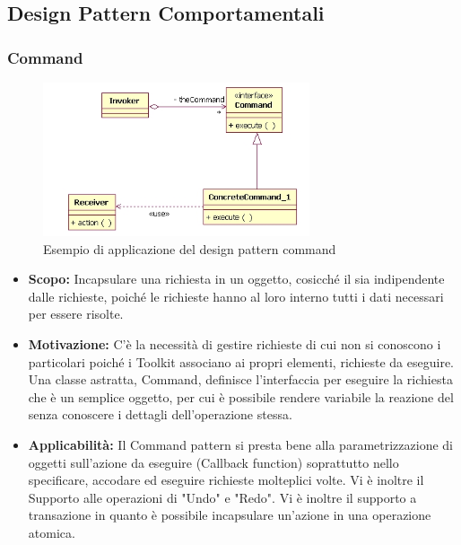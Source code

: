 \documentclass{scalatekids-article}
\begin{document}
\subsection{Design Pattern Comportamentali}

\subsubsection{Command}
\begin{figure}[H]
  \begin{center}
    \includegraphics[width=0.7\textwidth, keepaspectratio]{img/designPattern/CommandPattern.png}
    \caption{Esempio di applicazione del design pattern command}
  \end{center}
\end{figure}
\begin{itemize}
\item \textbf{Scopo:} Incapsulare una richiesta in un oggetto, cosicché il  sia indipendente dalle richieste, poiché le richieste hanno al loro interno tutti i dati necessari per essere risolte.
\item \textbf{Motivazione:} C'è la necessità di gestire richieste di cui non si conoscono i particolari poiché i Toolkit associano ai propri elementi, richieste da eseguire.
  Una classe astratta, Command, definisce l’interfaccia per eseguire la richiesta che è un semplice oggetto, per cui è possibile rendere variabile la reazione del  senza conoscere i dettagli dell'operazione stessa.
\item \textbf{Applicabilità:} Il Command pattern si presta bene alla parametrizzazione di oggetti sull’azione da eseguire (Callback function) soprattutto nello specificare, accodare ed eseguire richieste molteplici volte. Vi è inoltre il Supporto alle operazioni di "Undo" e "Redo". Vi è inoltre il supporto a transazione in quanto è possibile incapsulare un'azione in una operazione atomica.
\end{itemize}
\end{document}
